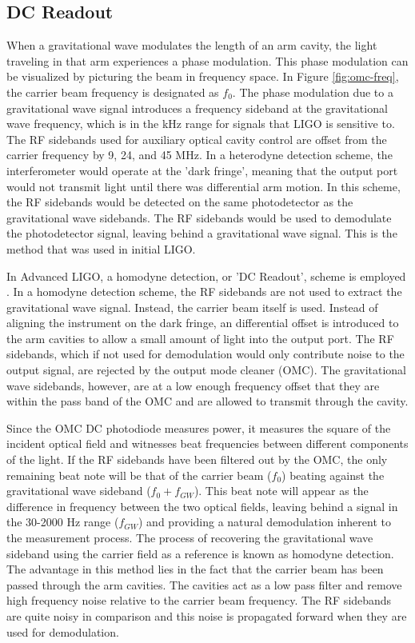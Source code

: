 \subsection{DC Readout}

When a gravitational wave modulates the length of an arm cavity, the light 
traveling in that arm experiences a phase modulation. This phase modulation 
can be visualized by picturing the beam in frequency space. In Figure 
\ref{fig:omc-freq}, the carrier beam frequency is designated as $f_0$. 
The phase modulation due to 
a gravitational wave signal introduces a frequency sideband at the 
gravitational wave frequency, which is in the kHz range for signals that 
LIGO is sensitive to. 
The 
RF sidebands used for auxiliary optical cavity control are offset from the 
carrier frequency by 9, 24, and 45 MHz. 
In a heterodyne detection scheme, the interferometer would operate at the 
'dark fringe', meaning that the output port would not transmit light until 
there was differential arm motion. In this scheme, the RF sidebands would be 
detected on the same photodetector as the gravitational wave sidebands. The 
RF sidebands would be used to demodulate the photodetector signal, leaving 
behind a gravitational wave signal. This is the method that was used in 
initial LIGO.

In Advanced LIGO, a homodyne detection, or 'DC Readout', scheme is employed 
\cite{DCReadout}. 
In a homodyne detection scheme, the RF sidebands are not used to extract the 
gravitational wave signal. Instead, the carrier beam itself is used. Instead of 
aligning the instrument on the dark fringe, an differential offset is introduced 
to the arm cavities to allow a small amount of light into the output port. 
The RF sidebands, which if not used for demodulation would only contribute 
noise to the output signal, 
are rejected by the output mode cleaner (OMC). 
The gravitational wave sidebands, however, are at a 
low enough frequency offset that they are within the pass band of the OMC 
and are allowed to transmit through the cavity.

Since the OMC DC photodiode measures power, it measures the square of the 
incident optical field and witnesses beat frequencies between different 
components of the light. If the RF sidebands have been filtered out by 
the OMC, the only remaining beat note will be that of the carrier beam ($f_0$) 
beating against the gravitational wave sideband ($f_0 + f_{GW}$). This beat note will 
appear as the difference in frequency between the two optical fields, 
leaving behind a signal in the 30-2000 Hz range ($f_{GW}$) and providing a 
natural demodulation inherent to the measurement process. 
The process of recovering the gravitational wave sideband using the 
carrier field as a reference is known as homodyne detection. The 
advantage in this method lies in the fact that the carrier beam 
has been passed through the arm cavities. The cavities act as a low 
pass filter and remove high frequency noise relative to the carrier 
beam frequency. The RF sidebands are quite noisy in comparison and this 
noise is propagated forward when they are used for demodulation. 

